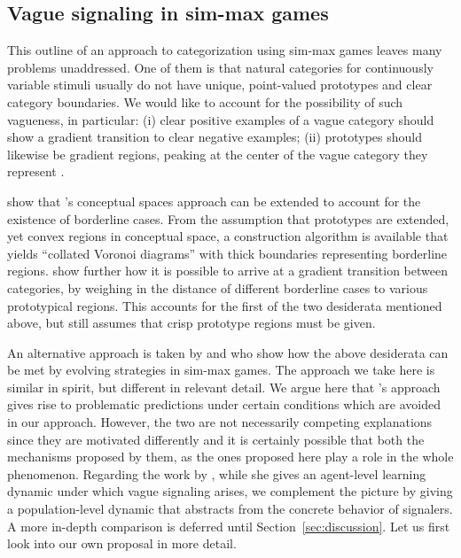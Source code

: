 \documentclass[fleqn,reqno,10pt]{article}
\begin{document}
\subsection{Vague signaling in sim-max games}

This outline of an approach to categorization using sim-max games
leaves many problems unaddressed. One of them is that natural
categories for continuously variable stimuli usually do not have
unique, point-valued prototypes and clear category boundaries. We
would like to account for the possibility of such vagueness, in
particular: (i) clear positive examples of a vague category should
show a gradient transition to clear negative examples;
(ii) prototypes should likewise be gradient regions, peaking at the
center of the vague category they represent
\citep[e.g.][]{Sainsbury1991:Is-There-Higher,KeefeSmith1997:Vagueness:-A-Re}.

\citet{DouvenDecock2011:Vagueness:-A-Co} show that
\citeauthor{Gardenfors2000:Conceptual-Spac}'s conceptual spaces
approach can be extended to account for the existence of borderline
cases. From the assumption that prototypes are extended, yet convex
regions in conceptual space, a construction algorithm is available
that yields ``collated Voronoi diagrams'' with thick boundaries
representing borderline
regions. \citet{DecockDouven2012:What-is-Graded-} show further how it
is possible to arrive at a gradient transition between categories, by
weighing in the distance of different borderline cases to various
prototypical regions. This accounts for the first of the two
desiderata mentioned above, but still assumes that crisp prototype
regions must be given.

An alternative approach is taken by
\citet{FrankeJager2010:Vagueness-Signa} and
\citet{OConnor2013:The-Evolution-o} who show how the above desiderata
can be met by evolving strategies in sim-max games. The approach we
take here is similar in spirit, but different in relevant detail. We
argue here that \citeauthor{FrankeJager2010:Vagueness-Signa}'s
approach gives rise to problematic predictions under certain conditions
which are avoided in our approach. However, the two are not necessarily
competing explanations since they are motivated differently and it is
certainly possible that both the mechanisms proposed by them, as the
ones proposed here play a role in the whole phenomenon.
Regarding the work by \citeauthor{OConnor2013:The-Evolution-o}, while she
gives an agent-level learning dynamic under which vague signaling arises,
we complement the picture by giving a population-level dynamic that
abstracts from the concrete behavior of signalers. A more in-depth
comparison is deferred until Section~\ref{sec:discussion}. Let us
first look into our own proposal in more detail.
\end{document}
